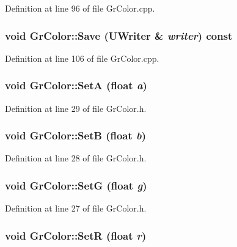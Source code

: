 Definition at line 96 of file GrColor.cpp.\hypertarget{class_gr_color_c55903eb54845df927fbcf8f20ae6da0}{
\subsubsection[{Save}]{\setlength{\rightskip}{0pt plus 5cm}void GrColor::Save ({\bf UWriter} \& {\em writer}) const}}
\label{class_gr_color_c55903eb54845df927fbcf8f20ae6da0}




Definition at line 106 of file GrColor.cpp.\hypertarget{class_gr_color_160b009ce60dc997e554a0b82b4a238f}{
\subsubsection[{SetA}]{\setlength{\rightskip}{0pt plus 5cm}void GrColor::SetA (float {\em a})}}
\label{class_gr_color_160b009ce60dc997e554a0b82b4a238f}




Definition at line 29 of file GrColor.h.\hypertarget{class_gr_color_71409afb6c4ac6765f1b92d80e25379e}{
\subsubsection[{SetB}]{\setlength{\rightskip}{0pt plus 5cm}void GrColor::SetB (float {\em b})}}
\label{class_gr_color_71409afb6c4ac6765f1b92d80e25379e}




Definition at line 28 of file GrColor.h.\hypertarget{class_gr_color_0ffcc02bd3353035230813c5f2686e77}{
\subsubsection[{SetG}]{\setlength{\rightskip}{0pt plus 5cm}void GrColor::SetG (float {\em g})}}
\label{class_gr_color_0ffcc02bd3353035230813c5f2686e77}




Definition at line 27 of file GrColor.h.\hypertarget{class_gr_color_4d973c54a9d67c7d61582c1454ae52e4}{
\subsubsection[{SetR}]{\setlength{\rightskip}{0pt plus 5cm}void GrColor::SetR (float {\em r})}}
\label{class_gr_color_4d973c54a9d67c7d61582c1454ae52e4}




